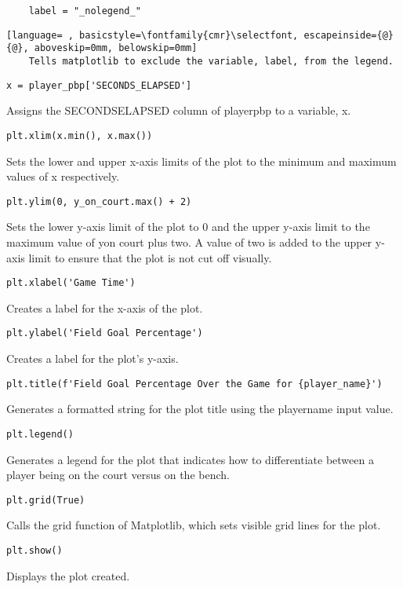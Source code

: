 \documentclass{article}
\begin{document}
\begin{lstlisting}
    label = "_nolegend_"
\end{lstlisting}
\begin{lstlisting}[language= , basicstyle=\fontfamily{cmr}\selectfont, escapeinside={@}{@}, aboveskip=0mm, belowskip=0mm]
    Tells matplotlib to exclude the variable, label, from the legend.
\end{lstlisting}
\begin{lstlisting}
x = player_pbp['SECONDS_ELAPSED']
\end{lstlisting}
Assigns the SECONDS\textunderscore ELAPSED column of player\textunderscore pbp to a variable, x.
\begin{lstlisting}
plt.xlim(x.min(), x.max())
\end{lstlisting}
Sets the lower and upper x-axis limits of the plot to the minimum and maximum values of x respectively.
\begin{lstlisting}
plt.ylim(0, y_on_court.max() + 2)
\end{lstlisting}
Sets the lower y-axis limit of the plot to 0 and the upper y-axis limit to the maximum value of y\textunderscore on \textunderscore court plus two. A value of two is added to the upper y-axis limit to ensure that the plot is not cut off visually.
\begin{lstlisting}
plt.xlabel('Game Time')
\end{lstlisting}
Creates a label for the x-axis of the plot.
\begin{lstlisting}
plt.ylabel('Field Goal Percentage')
\end{lstlisting}
Creates a label for the plot's y-axis.
\begin{lstlisting}
plt.title(f'Field Goal Percentage Over the Game for {player_name}')
\end{lstlisting}
Generates a formatted string for the plot title using the player\textunderscore name input value.
\begin{lstlisting}
plt.legend()
\end{lstlisting}
Generates a legend for the plot that indicates how to differentiate between a player being on the court versus on the bench.
\begin{lstlisting}
plt.grid(True)
\end{lstlisting}
Calls the grid function of Matplotlib, which sets visible grid lines for the plot.
\begin{lstlisting}
plt.show()
\end{lstlisting}
Displays the plot created.
\end{document}
